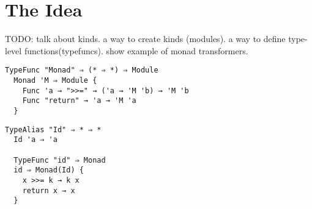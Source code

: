 \section{The Idea}
\begin{multicols}{2}
  TODO:
  talk about kinds.
  a way to create kinds (modules).
  a way to define type-level functions(typefuncs).
  show example of monad transformers.
  
  \begin{lstlisting}[caption=A generic monad transformer]
  TypeFunc "Monad" ⇒ (* ⇒ *) ⇒ Module
  Monad 'M ⇒ Module {
    Func 'a → ">>=" → ('a → 'M 'b) → 'M 'b
    Func "return" → 'a → 'M 'a
  }
  \end{lstlisting}
  \begin{lstlisting}[caption=the identity monad]
  TypeAlias "Id" ⇒ * ⇒ *
  Id 'a ⇒ 'a
  
  TypeFunc "id" ⇒ Monad 
  id ⇒ Monad(Id) {
    x >>= k → k x
    return x → x
  }
  \end{lstlisting}
\end{multicols}
